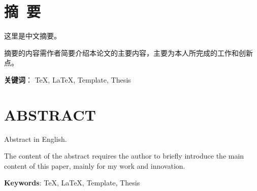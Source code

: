\newpage

\setcounter{page}{1} %

{
\let\clearpage\relax%
\chapter*{摘\ 要}
}

这里是中文摘要。

摘要的内容需作者简要介绍本论文的主要内容，主要为本人所完成的工作和创新
点。

\vspace{8mm}
\textbf{关键词}： \TeX, \LaTeX, Template, Thesis

\newpage
{
\let\clearpage\relax%
\chapter*{ABSTRACT}
}

Abstract in English.

The content of the abstract requires the author to briefly introduce the main content of this paper, mainly for my work and innovation.

\vspace{8mm}

\textbf{Keywords}: \TeX, \LaTeX, Template, Thesis
